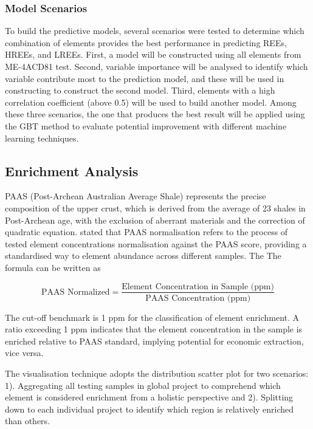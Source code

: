 \documentclass[11pt,a4paper,]{article}
\begin{document}
\subsubsection{Model Scenarios}\label{model-scenarios}

To build the predictive models, several scenarios were tested to determine which combination of elements provides the best performance in predicting REEs, HREEs, and LREEs. First, a model will be constructed using all elements from ME-4ACD81 test. Second, variable importance will be analysed to identify which variable contribute most to the prediction model, and these will be used in constructing to construct the second model. Third, elements with a high correlation coefficient (above 0.5) will be used to build another model. Among these three scenarios, the one that produces the best result will be applied using the GBT method to evaluate potential improvement with different machine learning techniques.

\subsection{Enrichment Analysis}\label{enrichment-analysis}

PAAS (Post-Archean Australian Average Shale) represents the precise composition of the upper crust, which is derived from the average of 23 shales in Post-Archean age, with the exclusion of aberrant materials and the correction of quadratic equation. \textcite{McLennan1989} stated that PAAS normalisation refers to the process of tested element concentrations normalisation against the PAAS score, providing a standardised way to element abundance across different samples. The The formula can be written as

\[\text{PAAS Normalized}=\frac{ \text{Element Concentration in Sample (ppm)}}{\text{PAAS Concentration (ppm)}}\]

The cut-off benchmark is 1 ppm for the classification of element enrichment. A ratio exceeding 1 ppm indicates that the element concentration in the sample is enriched relative to PAAS standard, implying potential for economic extraction, vice versa.

The visualisation technique adopts the distribution scatter plot for two scenarios: 1). Aggregating all testing samples in global project to comprehend which element is considered enrichment from a holistic perspective and 2). Splitting down to each individual project to identify which region is relatively enriched than others.
\end{document}
